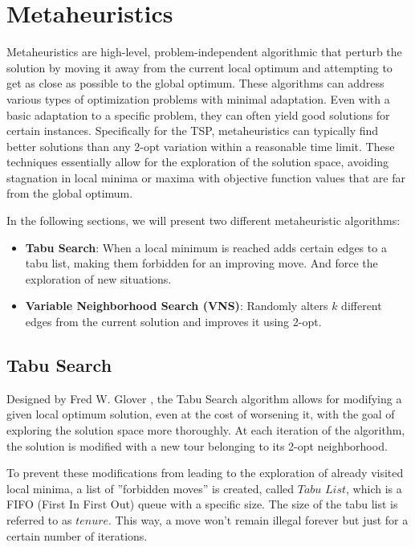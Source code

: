 \chapter{Metaheuristics}
Metaheuristics are high-level, problem-independent algorithmic that perturb the solution by moving it away from the current local optimum and attempting to get as close as possible to the global optimum. These algorithms can address various types of optimization problems with minimal adaptation. Even with a basic adaptation to a specific problem, they can often yield good solutions for certain instances. Specifically for the TSP, metaheuristics can typically find better solutions than any 2-opt variation within a reasonable time limit. These techniques essentially allow for the exploration of the solution space, avoiding stagnation in local minima or maxima with objective function values that are far from the global optimum.

In the following sections, we will present two different metaheuristic algorithms:
\begin{itemize}
    \item \textbf{Tabu Search}: When a local minimum is reached adds certain edges to a tabu list, making them forbidden for an improving move. And force the exploration of new situations.
    \item \textbf{Variable Neighborhood Search (VNS)}: Randomly alters \( k \) different edges from the current solution and improves it using 2-opt.
\end{itemize}

\section{Tabu Search}
\label{chap:tabusec}
Designed by Fred W. Glover \cite{tabusearch}, the Tabu Search algorithm allows for modifying a given local optimum solution, even at the cost of worsening it, with the goal of exploring the solution space more thoroughly. At each iteration of the algorithm, the solution is modified with a new tour belonging to its 2-opt neighborhood.

To prevent these modifications from leading to the exploration of already visited local minima, a list of ''forbidden moves'' is created, called \(Tabu\) \(List\), which is a FIFO (First In First Out) queue with a specific size. The size of the tabu list is referred to as \(tenure\). This way, a move won’t remain illegal forever but just for a certain number of iterations. 

